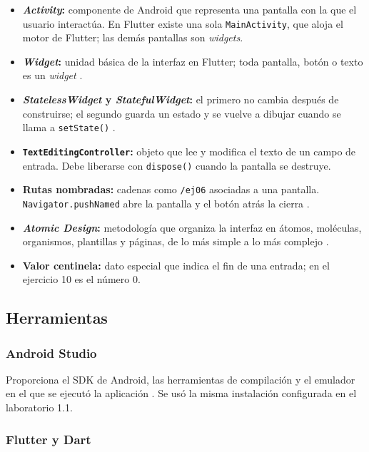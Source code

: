 \documentclass[12pt,a4paper]{article}
\begin{document}
\begin{itemize}[leftmargin=1.5cm]
  \item \textbf{\textit{Activity}:} componente de Android que representa una pantalla con la que el usuario interactúa. En Flutter existe una sola \texttt{MainActivity}, que aloja el motor de Flutter; las demás pantallas son \textit{widgets}.
  \item \textbf{\textit{Widget}:} unidad básica de la interfaz en Flutter; toda pantalla, botón o texto es un \textit{widget} \citep{flutterdocs}.
  \item \textbf{\textit{StatelessWidget} y \textit{StatefulWidget}:} el primero no cambia después de construirse; el segundo guarda un estado y se vuelve a dibujar cuando se llama a \texttt{setState()} \citep{flutterinteractivity}.
  \item \textbf{\texttt{TextEditingController}:} objeto que lee y modifica el texto de un campo de entrada. Debe liberarse con \texttt{dispose()} cuando la pantalla se destruye.
  \item \textbf{Rutas nombradas:} cadenas como \texttt{/ej06} asociadas a una pantalla. \texttt{Navigator.pushNamed} abre la pantalla y el botón atrás la cierra \citep{flutternav}.
  \item \textbf{\textit{Atomic Design}:} metodología que organiza la interfaz en átomos, moléculas, organismos, plantillas y páginas, de lo más simple a lo más complejo \citep{frost2016}.
  \item \textbf{Valor centinela:} dato especial que indica el fin de una entrada; en el ejercicio 10 es el número 0.
\end{itemize}

\subsection{Herramientas}

\subsubsection{Android Studio}

Proporciona el SDK de Android, las herramientas de compilación y el emulador en el que se ejecutó la aplicación \citep{androidstudio}. Se usó la misma instalación configurada en el laboratorio 1.1.

\subsubsection{Flutter y Dart}
\end{document}
